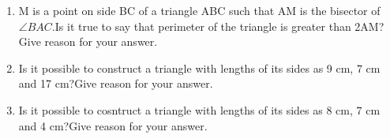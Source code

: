 \documentclass[12pt]{article}
\begin{document}
\begin{enumerate}
\item M is a point on side BC of a triangle ABC such that AM is the bisector of $ \angle{BAC} $.Is it true to say that perimeter of the triangle is greater than 2AM?Give reason for your answer.

\item Is it possible to construct a triangle with lengths of its sides as 9 cm, 7 cm and 17 cm?Give reason for your answer.

\item Is it possible to cosntruct a triangle with lengths of its sides as 8 cm, 7 cm and 4 cm?Give reason for your answer.

\end{enumerate}
\end{document}
